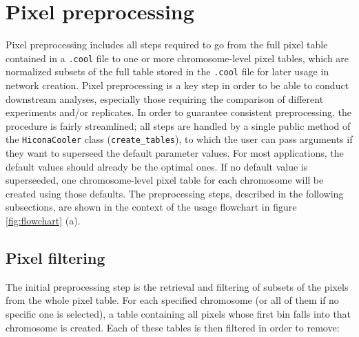 \section{Pixel preprocessing}
Pixel preprocessing includes all steps required to go from the full pixel table contained in a \texttt{.cool} file to one or more chromosome-level pixel tables, which are normalized subsets of the full table stored in the \texttt{.cool} file for later usage in network creation.  
Pixel preprocessing is a key step in order to be able to conduct downstream analyses, especially those requiring the comparison of different experiments and/or replicates. In order to guarantee consistent preprocessing, the procedure is fairly streamlined; all steps are handled by a single public method of the \texttt{HiconaCooler} class (\texttt{create\_tables}), to which the user can pass arguments if they want to superseed the default parameter values. For most applications, the default values should already be the optimal ones. If no default value is superseeded, one chromosome-level pixel table for each chromosome will be created using those defaults. The preprocessing steps, described in the following subsections, are shown in the context of the usage flowchart in figure \ref{fig:flowchart} (a).

\subsection{Pixel filtering}

The initial preprocessing step is the retrieval and filtering of subsets of the pixels from the whole pixel table. For each specified chromosome (or all of them if no specific one is selected), a table containing all pixels whose first bin falls into that chromosome is created. Each of these tables is then filtered in order to remove:

